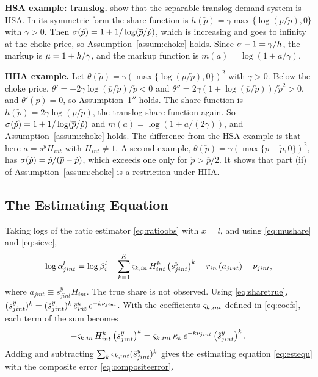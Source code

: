 \textbf{HSA example: translog.}
\textcite{Matsuyama&Ushev17} show that the separable translog demand system is HSA.
In its symmetric form the share function is $h(\check{p}) = \gamma \max\{\log(\overline{p}/\check{p}), 0\}$ with $\gamma > 0$.
Then $\sigma(\check{p}) = 1 + 1/\log(\overline{p}/\check{p})$, which is increasing and goes to infinity at the choke price, so Assumption~\ref{assum:choke} holds.
Since $\sigma - 1 = \gamma/h$, the markup is $\mu = 1 + h/\gamma$, and the markup function is $m(a) = \log(1 + a/\gamma)$.

\textbf{HIIA example.}
Let $\theta(\check{p}) = \gamma \left(\max\{\log(\overline{p}/\check{p}), 0\}\right)^2$ with $\gamma > 0$.
Below the choke price, $\theta' = -2\gamma \log(\overline{p}/\check{p})/\check{p} < 0$ and $\theta'' = 2\gamma\left(1 + \log(\overline{p}/\check{p})\right)/\check{p}^2 > 0$, and $\theta'(\overline{p}) = 0$, so Assumption~1$''$ holds.
The share function is $h(\check{p}) = 2\gamma \log(\overline{p}/\check{p})$, the translog share function again.
So $\sigma(\check{p}) = 1 + 1/\log(\overline{p}/\check{p})$ and $m(a) = \log(1 + a/(2\gamma))$, and Assumption~\ref{assum:choke} holds.
The difference from the HSA example is that here $a = s^y H_{int}$ with $H_{int} \neq 1$.
A second example, $\theta(\check{p}) = \gamma \left(\max\{\overline{p} - \check{p}, 0\}\right)^2$, has $\sigma(\check{p}) = \check{p}/(\overline{p} - \check{p})$, which exceeds one only for $\check{p} > \overline{p}/2$.
It shows that part (ii) of Assumption~\ref{assum:choke} is a restriction under HIIA.

\subsection{The Estimating Equation}\label{sec:app-estequ}

Taking logs of the ratio estimator \eqref{eq:ratioobs} with $x = l$, and using \eqref{eq:mushare} and \eqref{eq:sieve},
\begin{equation*}
	\log \tilde{\alpha}^l_{jint} = \log \beta^l_i - \sum_{k=1}^{K} \varsigma_{k,in} \, H_{int}^k \left(s^y_{jint}\right)^k - r_{in}\left(a_{jint}\right) - \nu_{jint},
\end{equation*}
where $a_{jint} \equiv s^y_{jint} H_{int}$.
The true share is not observed.
Using \eqref{eq:sharetrue}, $(s^y_{jint})^k = (\tilde{s}^y_{jint})^k \, \bar{e}_{int}^k \, e^{-k\nu_{jint}}$.
With the coefficients $\varsigma_{k,int}$ defined in \eqref{eq:coefs}, each term of the sum becomes
\begin{equation*}
	-\varsigma_{k,in} \, H_{int}^k \left(s^y_{jint}\right)^k = \varsigma_{k,int} \, \kappa_k \, e^{-k\nu_{jint}} \left(\tilde{s}^y_{jint}\right)^k.
\end{equation*}
Adding and subtracting $\sum_k \varsigma_{k,int} (\tilde{s}^y_{jint})^k$ gives the estimating equation \eqref{eq:estequ} with the composite error \eqref{eq:compositeerror}.


